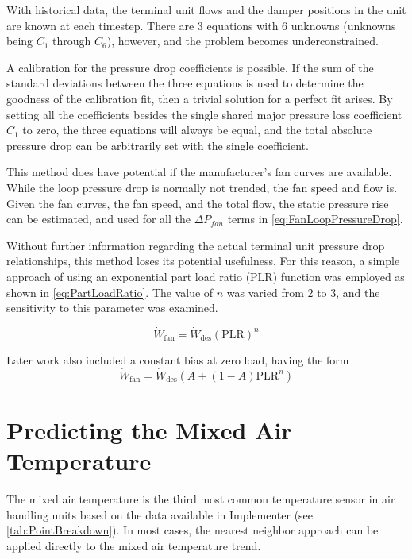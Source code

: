 With historical data, the terminal unit flows and the damper positions
in the unit are known at each timestep. There are 3 equations with 6
unknowns (unknowns being \(C_{1}\) through \(C_{6}\)), however, and the
problem becomes underconstrained. 

A calibration for the pressure drop coefficients is possible. If the sum
of the standard deviations between the three equations is used to
determine the goodness of the calibration fit, then a trivial solution
for a perfect fit arises. By setting all the coefficients besides the
single shared major pressure loss coefficient \(C_1\) to zero, the three
equations will always be equal, and the total absolute pressure drop can
be arbitrarily set with the single coefficient.

This method does have potential if the manufacturer's fan curves are
available. While the loop pressure drop is normally not trended, the fan
speed and flow is. Given the fan curves, the fan speed, and the total
flow, the static pressure rise can be estimated, and used for all the
\(\Delta P_{fan} \) terms in  \ref{eq:FanLoopPressureDrop}.

Without further information regarding the actual terminal unit pressure
drop relationships, this method loses its potential usefulness. For this
reason, a simple approach of using an exponential part load ratio (PLR)
function was employed as shown in  \ref{eq:PartLoadRatio}. The value
of \(n\) was varied from 2 to 3, and the sensitivity to this parameter was
examined.


\begin{equation}\label{eq:PartLoadRatio}
    \dot{W}_{\text{fan}} = \dot{W}_{\text{des}} \left(\text{PLR}\right)^n
\end{equation}

Later work also included a constant bias at zero load, having the form
\begin{equation}
    \dot{W}_{\text{fan}} = \dot{W}_{\text{des}} \left(A +
    \left(1-A\right)\text{PLR}^{n}\right)
\end{equation}

\section{Predicting the Mixed Air Temperature}

The mixed air temperature is the third most common temperature sensor in
air handling units based on the data available in Implementer (see
\tableref{} \ref{tab:PointBreakdown}). In most cases, the nearest
neighbor approach can be applied directly to the mixed air temperature
trend.

